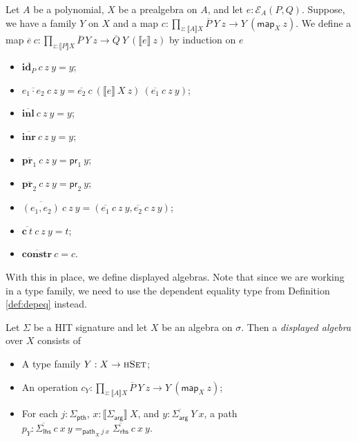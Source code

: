 \documentclass[9pt]{entcs}
\newcommand{\type}[1]{\textsc{#1}}
\newcommand{\constructor}[1]{\mathbf{#1}}
\newcommand{\nattranstxt}[1]{\mathsf{#1}}
\newcommand{\function}[1]{\mathsf{#1}}
\newcommand{\deprod}[3]{\prod_{#1 : #2} #3} %
\newcommand{\hset}{\type{hSet}} %
\newcommand{\0}{\textbf{0}} %
\newcommand{\1}{\textbf{1}} %
\newcommand{\depeq}[3]{#2 =_{#1} #3} %
\newcommand{\prlt}{\nattranstxt{pr}_1} %
\newcommand{\prrt}{\nattranstxt{pr}_2} %
\newcommand{\ep}[3]{\mathcal{E}_{#1}(#2,#3)} %
\newcommand{\id}[1]{\constructor{id}_{#1}} %
\newcommand{\comp}[2]{#1 \cdot #2} %
\newcommand{\inle}{\constructor{inl}} %
\newcommand{\inre}{\constructor{inr}} %
\newcommand{\prle}{\constructor{pr}_1} %
\newcommand{\prre}{\constructor{pr}_2} %
\newcommand{\pair}[2]{(#1 , #2)} %
\newcommand{\Ce}{\constructor{c}} %
\newcommand{\constr}{\constructor{constr}} %
\newcommand{\pthI}[0]{\textsf{pth}}
\newcommand{\pthA}[0]{\textsf{arg}}
\newcommand{\pthlh}[0]{\textsf{lhs}}
\newcommand{\pthrh}[0]{\textsf{rhs}}
\newcommand{\pathI}[1]{#1_{\pthI}} %
\newcommand{\pathA}[1]{#1_{\pthA}} %
\newcommand{\pathlh}[1]{#1_{\pthlh}} %
\newcommand{\pathrh}[1]{#1_{\pthrh}} %
\newcommand{\semP}[1]{\llbracket #1 \rrbracket} %
\newcommand{\semE}[1]{\llbracket #1 \rrbracket} %
\newcommand{\constrA}[1]{\function{map}_{#1}} %
\newcommand{\constrP}[1]{\function{path}_{#1}} %
\newcommand{\polydact}[2]{\overline{#1} \> #2}
\newcommand{\epdact}[2]{\overline{#1} \> #2}
\begin{document}
\begin{definition}
Let $A$ be a polynomial, $X$ be a prealgebra on $A$, and let $e : \ep{A}{P}{Q}$.
Suppose, we have a family $Y$ on $X$ and a map $c : \deprod{z}{\semP{A}{X}}{\polydact{P}{Y} \> z \rightarrow Y \> (\constrA{X} \> z)}$.
We define a map $\epdact{e}{c} : \deprod{z}{\semP{P}{X}}{\polydact{P}{Y} \> z \rightarrow \polydact{Q}{Y} \> (\semE{e} \> z)}$ by induction on $e$
\begin{itemize}
	\item $\epdact{\id{P}}{c} \> z \> y = y$;
	\item $\epdact{\comp{e_1}{e_2}}{c} \> z \> y = \epdact{e_2}{c} \> (\semE{e} \> X \> z) \> (\epdact{e_1}{c} \> z \> y)$;
	\item $\epdact{\inle}{c} \> z \> y = y$;
	\item $\epdact{\inre}{c} \> z \> y = y$;
	\item $\epdact{\prle}{c} \> z \> y = \prlt \> y$;
	\item $\epdact{\prre}{c} \> z \> y = \prrt \> y$;
	\item $\epdact{\pair{e_1}{e_2}}{c} \> z \> y = (\epdact{e_1}{c} \> z \> y , \epdact{e_2}{c} \> z \> y)$;
	\item $\epdact{\Ce \> t}{c} \> z \> y = t$;
	\item $\epdact{\constr}{c} = c$.
\end{itemize}
\end{definition}

With this in place, we define displayed algebras.
Note that since we are working in a type family, we need to use the dependent equality type from Definition \ref{def:depeq} instead.

\begin{definition}
Let $\Sigma$ be a HIT signature and let $X$ be an algebra on $\sigma$.
Then a \emph{displayed algebra} over $X$ consists of
\begin{itemize}
	\item A type family $Y : X \rightarrow \hset$;
	\item An operation $c_Y : \deprod{z}{\semP{A}{X}}{\polydact{P}{Y} \> z \rightarrow Y \> (\constrA{X} \> z)}$;
	\item For each $j : \pathI{\Sigma}$, $x : \semP{\pathA{\Sigma}} \> X$, and $y : \polydact{\pathA{\Sigma}}{Y} \> x$,  a path $p_Y : \depeq{\constrP{X} \> j \> x}{\epdact{\pathlh{\Sigma}}{c} \> x \> y}{\epdact{\pathrh{\Sigma}}{c} \> x \> y}$.
\end{itemize} 
\end{definition}
\end{document}
